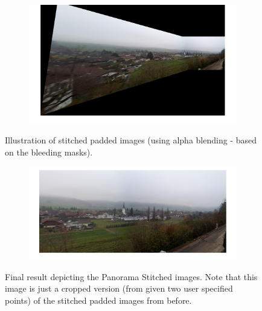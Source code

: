 \documentclass{paper}
\begin{document}
\begin{figure}[H]
    \centering
    \begin{subfigure}{1.0\textwidth}
        \includegraphics[width=\textwidth]{stitching/stitched_raw_1}
    \end{subfigure}
    
    \caption{Illustration of stitched padded images (using alpha blending - based on the bleeding masks).}
    \label{fig:stitching_stitched}       
\end{figure}

\begin{figure}[H]
    \centering
    \begin{subfigure}{1.0\textwidth}
        \includegraphics[width=\textwidth]{stitching/cropped_stitched_1}
    \end{subfigure}
    
    \caption{Final result depicting the Panorama Stitched images. Note that this image is just a cropped version (from given two user specified points) of the stitched padded images from before. }
    \label{fig:stitching_stitched_cropped}       
\end{figure}
\end{document}
